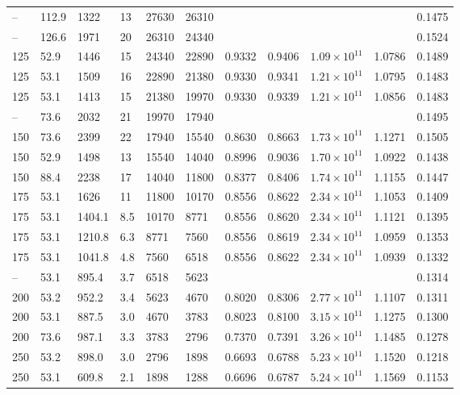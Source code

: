 \begin{chplandscape}
\begin{small}
\begin{longtable}{p{1.1cm}p{1.1cm}p{1.3cm}p{1.5cm}p{1.3cm}p{1.3cm}p{1.3cm}p{1.3cm}p{1.5cm}p{1.0cm}p{1.3cm}}
-- & 112.9 & 1322 & 13 & 27630 & 26310 &  &  &  &  & 0.1475 \\
-- & 126.6 & 1971 & 20 & 26310 & 24340 &  &  &  &  & 0.1524 \\
125 & 52.9 & 1446 & 15 & 24340 & 22890 & 0.9332 & 0.9406 & \(1.09\!\times\!10^{11}\) & 1.0786 & 0.1489 \\
125 & 53.1 & 1509 & 16 & 22890 & 21380 & 0.9330 & 0.9341 & \(1.21\!\times\!10^{11}\) & 1.0795 & 0.1483 \\
125 & 53.1 & 1413 & 15 & 21380 & 19970 & 0.9330 & 0.9339 & \(1.21\!\times\!10^{11}\) & 1.0856 & 0.1483 \\
-- & 73.6 & 2032 & 21 & 19970 & 17940 &  &  &  &  & 0.1495 \\
150 & 73.6 & 2399 & 22 & 17940 & 15540 & 0.8630 & 0.8663 & \(1.73\!\times\!10^{11}\) & 1.1271 & 0.1505 \\
150 & 52.9 & 1498 & 13 & 15540 & 14040 & 0.8996 & 0.9036 & \(1.70\!\times\!10^{11}\) & 1.0922 & 0.1438 \\
150 & 88.4 & 2238 & 17 & 14040 & 11800 & 0.8377 & 0.8406 & \(1.74\!\times\!10^{11}\) & 1.1155 & 0.1447 \\
175 & 53.1 & 1626 & 11 & 11800 & 10170 & 0.8556 & 0.8622 & \(2.34\!\times\!10^{11}\) & 1.1053 & 0.1409 \\
175 & 53.1 & 1404.1 & 8.5 & 10170 & 8771 & 0.8556 & 0.8620 & \(2.34\!\times\!10^{11}\) & 1.1121 & 0.1395 \\
175 & 53.1 & 1210.8 & 6.3 & 8771 & 7560 & 0.8556 & 0.8619 & \(2.34\!\times\!10^{11}\) & 1.0959 & 0.1353 \\
175 & 53.1 & 1041.8 & 4.8 & 7560 & 6518 & 0.8556 & 0.8622 & \(2.34\!\times\!10^{11}\) & 1.0939 & 0.1332 \\
-- & 53.1 & 895.4 & 3.7 & 6518 & 5623 &  &  &  &  & 0.1314 \\
200 & 53.2 & 952.2 & 3.4 & 5623 & 4670 & 0.8020 & 0.8306 & \(2.77\!\times\!10^{11}\) & 1.1107 & 0.1311 \\
200 & 53.1 & 887.5 & 3.0 & 4670 & 3783 & 0.8023 & 0.8100 & \(3.15\!\times\!10^{11}\) & 1.1275 & 0.1300 \\
200 & 73.6 & 987.1 & 3.3 & 3783 & 2796 & 0.7370 & 0.7391 & \(3.26\!\times\!10^{11}\) & 1.1485 & 0.1278 \\
250 & 53.2 & 898.0 & 3.0 & 2796 & 1898 & 0.6693 & 0.6788 & \(5.23\!\times\!10^{11}\) & 1.1520 & 0.1218 \\
250 & 53.1 & 609.8 & 2.1 & 1898 & 1288 & 0.6696 & 0.6787 & \(5.24\!\times\!10^{11}\) & 1.1569 & 0.1153 \\

\end{longtable}
\end{small}
\end{chplandscape}
